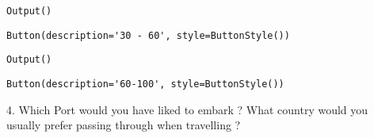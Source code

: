 \documentclass[11pt]{article}
\begin{document}
    
    
    \begin{verbatim}
Output()
    \end{verbatim}

    
    
    \begin{verbatim}
Button(description='30 - 60', style=ButtonStyle())
    \end{verbatim}

    
    
    \begin{verbatim}
Output()
    \end{verbatim}

    
    
    \begin{verbatim}
Button(description='60-100', style=ButtonStyle())
    \end{verbatim}

    
    4. Which Port would you have liked to embark ? What country would you
usually prefer passing through when travelling ?
\end{document}
